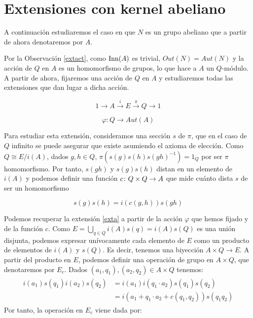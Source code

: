 
\section{Extensiones con kernel abeliano}\label{sec:ab}

A continuación estudiaremos el caso en que $N$ es un grupo abeliano que a partir de ahora denotaremos por $A$. 

Por la Observación \ref{extact}, como $\operatorname{Inn}(A)$ es trivial, $Out(N)=Aut(N)$ y la acción de $Q$ en $A$ es un homomorfismo de grupos, lo que hace a $A$ un $Q$-módulo. A partir de ahora, fijaremos una acción de $Q$ en $A$ y estudiaremos todas las extensiones que dan lugar a dicha acción.

\begin{equation}\label{exta}
	1\to A\xrightarrow{i} E\xrightarrow{\pi} Q\to 1
\end{equation}

\begin{equation}
	\varphi \colon Q \to Aut(A)
\end{equation}

Para estudiar esta extensión, consideramos una sección $s$ de $\pi$, que en el caso de $Q$ infinito se puede asegurar que existe asumiendo el axioma de elección. Como $Q\cong E/i(A)$, dados $g,h\in Q$, $\pi\left(s(g)s(h)s(gh)^{-1}\right) = 1_{Q}$ por ser $\pi$ homomorfismo. Por tanto, $s(gh)$ y $s(g)s(h)$ distan en un elemento de $i(A)$ y podemos definir una función $c\colon Q\times Q\to A$ que mide cuánto dista $s$ de ser un homomorfismo

\begin{equation}
	s(g)s(h) = i\left(c(g,h)\right)s(gh)
\end{equation}

Podemos recuperar la extensión \eqref{exta} a partir de la acción $\varphi$ que hemos fijado y de la función $c$. 
Como $E=\bigcup\limits_{q\in Q} i(A)s(q) = i(A)s(Q)$ es una unión disjunta, podemos expresar unívocamente cada elemento de $E$ como un producto de elementos de $i(A)$ y $s(Q)$. Es decir, tenemos una biyección $A\times Q \to E$. A partir del producto en $E$, podemos definir una operación de grupo en $A\times Q$, que denotaremos por $E_{c}$. Dados $(a_1,q_1),(a_2,q_2)\in A\times Q$ tenemos:
\begin{align}\begin{split}
i(a_1)s(q_1)i(a_2)s(q_2) &= i(a_1)i(q_1\cdot a_2)s(q_1)s(q_2) \\ &= i(a_1+ q_1\cdot a_2 + c(q_1,q_2))s(q_1q_2)
\end{split}\end{align}
\noindent Por tanto, la operación en $E_c$ viene dada por:

